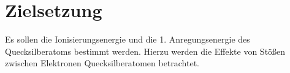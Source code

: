 
\section{Zielsetzung}
\label{sec:Zielsetzung}
Es sollen die Ionisierungsenergie und die 1. Anregungsenergie des Quecksilberatoms
 bestimmt werden. Hierzu werden die Effekte von Stößen zwischen Elektronen 
 Quecksilberatomen betrachtet.
